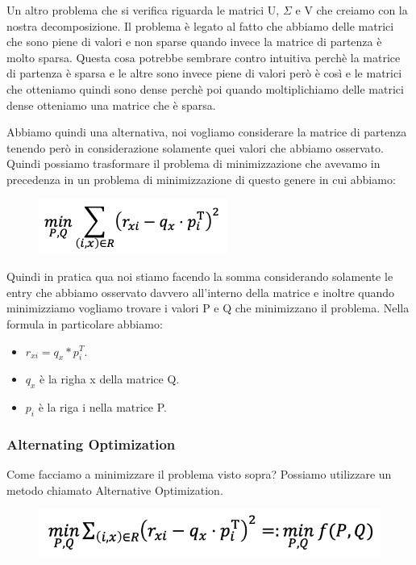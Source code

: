\documentclass[14pt]{extreport}
\begin{document}
Un altro problema che si verifica riguarda le matrici U, $\Sigma$ e V che creiamo con la nostra decomposizione. Il problema è legato al fatto che abbiamo delle matrici
che sono piene di valori e non sparse quando invece la matrice di partenza è molto sparsa. Questa cosa potrebbe sembrare contro intuitiva perchè la matrice di partenza
è sparsa e le altre sono invece piene di valori però è così e le matrici che otteniamo quindi sono dense perchè poi quando moltiplichiamo delle matrici dense 
otteniamo una matrice che è sparsa.

Abbiamo quindi una alternativa, noi vogliamo considerare la matrice di partenza tenendo però in considerazione solamente quei valori che abbiamo osservato.
Quindi possiamo trasformare il problema di minimizzazione che avevamo in precedenza in un problema di minimizzazione di questo genere in cui abbiamo:


\begin{figure}[H] 
	\centering
	\includegraphics[width=0.7\linewidth]{515.jpeg}
	\end{figure}

Quindi in pratica qua noi stiamo facendo la somma considerando solamente le entry che abbiamo osservato davvero all'interno della matrice e inoltre 
quando minimizziamo vogliamo trovare i valori P e Q che minimizzano il problema.
Nella formula in particolare abbiamo:

\begin{itemize}
	\item $r_{xi} = q_x * p_i^T$.
	\item $q_x$ è la righa x della matrice Q.
	\item $p_i$ è la riga i nella matrice P.
\end{itemize}

\subsubsection{Alternating Optimization}

Come facciamo a minimizzare il problema visto sopra? Possiamo utilizzare un metodo chiamato Alternative Optimization.

\begin{figure}[H] 
\centering
\includegraphics[width=0.7\linewidth]{516.jpeg}
\end{figure}
\end{document}
